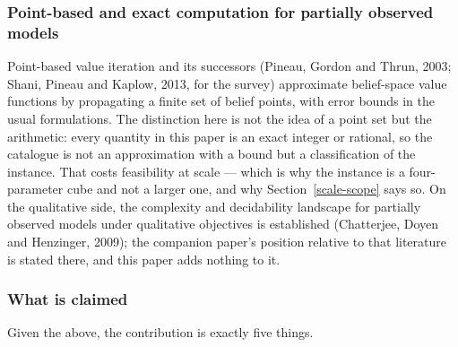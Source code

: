 \documentclass[10pt,twocolumn]{article}
\theoremstyle{plain}
\theoremstyle{definition}
\theoremstyle{remark}
\begin{document}
\subsubsection{Point-based and exact computation for partially observed models}

Point-based value iteration and its successors (Pineau, Gordon and Thrun, 2003; Shani,
Pineau and Kaplow, 2013, for the survey) approximate belief-space value functions by
propagating a finite set of belief points, with error bounds in the usual formulations. The
distinction here is not the idea of a point set but the arithmetic: every quantity in this
paper is an exact integer or rational, so the catalogue is not an approximation with a
bound but a classification of the instance. That costs feasibility at scale --- which is why
the instance is a four-parameter cube and not a larger one, and why
Section~\ref{scale-scope} says so. On the qualitative side, the complexity and decidability
landscape for partially observed models under qualitative objectives is established
(Chatterjee, Doyen and Henzinger, 2009); the companion paper's position relative to that
literature is stated there, and this paper adds nothing to it.

\subsubsection{What is claimed}

Given the above, the contribution is exactly five things.
\end{document}
